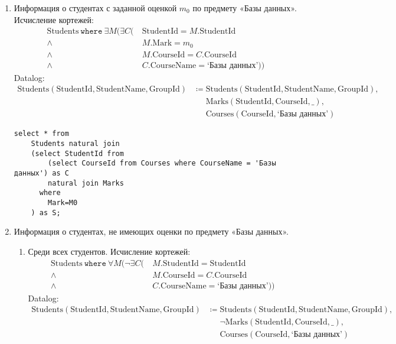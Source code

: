 \documentclass{article}
\newcommand{\Students}{\mathrm{Students}}
\newcommand{\StudentId}{\mathrm{StudentId}}
\newcommand{\StudentName}{\mathrm{StudentName}}
\newcommand{\GroupId}{\mathrm{GroupId}}
\newcommand{\Courses}{\mathrm{Courses}}
\newcommand{\CourseId}{\mathrm{CourseId}}
\newcommand{\CourseName}{\mathrm{CourseName}}
\newcommand{\Marks}{\mathrm{Marks}}
\newcommand{\Mark}{\mathrm{Mark}}
\newcommand{\where}{~\mathtt{where}~}
\newcommand{\poloneq}{\mathrel{\phantom{\coloneq}}}
\begin{document}
\begin{enumerate}
    \item Информация о студентах с заданной оценкой $m_0$ по предмету «Базы данных».
    Исчисление кортежей:
    \begin{align*}
        \Students \where \exists M (\exists C
        (&\ \StudentId = M.\StudentId \\
            \land&\ M.\Mark = m_0 \\
            \land&\ M.\CourseId = C.\CourseId \\
            \land&\ C.\CourseName = \text{`Базы данных'}))
    \end{align*}
    Datalog:
    \begin{align*}
        \Students(\StudentId, \StudentName, \GroupId)
        &\coloneq \Students(\StudentId, \StudentName, \GroupId), \\
        &\poloneq \Marks(\StudentId, \CourseId, \_), \\
        &\poloneq \Courses(\CourseId, \text{`Базы данных'})
    \end{align*}
    \begin{verbatim}
select * from
    Students natural join
    (select StudentId from
        (select CourseId from Courses where CourseName = 'Базы данных') as C
        natural join Marks
      where
        Mark=M0
    ) as S;
    \end{verbatim}
    \item Информация о студентах, не имеющих оценки по предмету «Базы данных».
    \begin{enumerate}
        \item Среди всех студентов.
        Исчисление кортежей:
        \begin{align*}
            \Students \where \forall M (\neg \exists C
            (&\ M.\StudentId = \StudentId \\
                \land&\  M.\CourseId = C.\CourseId \\
                \land&\  C.\CourseName = \text{`Базы данных'}))
        \end{align*}
        Datalog:
        \begin{align*}
            \Students(\StudentId, \StudentName, \GroupId)
            &\coloneq \Students(\StudentId, \StudentName, \GroupId), \\
            &\poloneq \neg \Marks(\StudentId, \CourseId, \_), \\
            &\poloneq \Courses(\CourseId, \text{`Базы данных'})

\end{align*}
\end{enumerate}
\end{enumerate}
\end{document}
